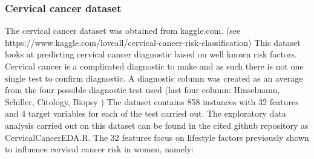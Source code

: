 \subsubsection{Cervical cancer dataset}
The cervical cancer dataset was obtained from kaggle.com. \newline
(see https://www.kaggle.com/loveall/cervical-cancer-risk-classification)\newline
This dataset looks at predicting cervical cancer diagnostic based on well known risk factors. Cervical cancer is a complicated diagnostic to make and as such there is not one single test to confirm diagnostic. A diagnostic column was created as an average from the four possible diagnostic test used  (last four column: Hinselmann, Schiller, Citology, Biopsy ) \citep{Fernandes:2017td} %
The dataset contains 858 instances with 32 features and 4 target variables for each of the test carried out.
The exploratory data analysis carried out on this dataset can be found in the cited github repository as CervicalCancerEDA.R.
The 32 features focus on lifestyle factors previously shown to influence cervical cancer risk in women, namely:
